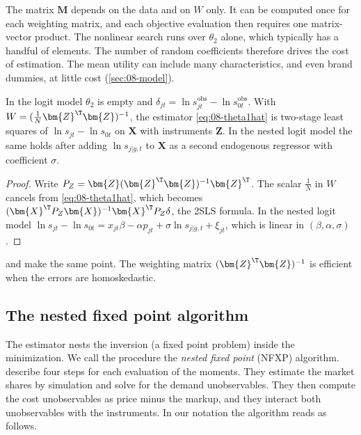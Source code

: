 The matrix $\bm{M}$ depends on the data and on $W$ only. It can be computed once for each weighting matrix,
and each objective evaluation then requires one matrix-vector product. The nonlinear search runs over
$\theta_2$ alone, which typically has a handful of elements. The number of random coefficients therefore drives the
cost of estimation. The mean utility can include many characteristics, and even brand dummies, at little cost
(\cref{sec:08-model}).

\begin{corollary}\label{cor:08-2sls}
In the logit model $\theta_2$ is empty and $\delta_{jt} = \ln s^{\text{obs}}_{jt} - \ln s^{\text{obs}}_{0t}$. With $W =
(\frac{1}{N}\bm{Z}^\T\bm{Z})^{-1}$, the estimator \eqref{eq:08-theta1hat} is two-stage least squares of
$\ln s_{jt} - \ln s_{0t}$ on $\bm{X}$ with instruments $\bm{Z}$. In the nested logit model the same holds
after adding $\ln s_{j|g,t}$ to $\bm{X}$ as a second endogenous regressor with coefficient $\sigma$.
\end{corollary}

\begin{proof}
Write $P_Z = \bm{Z}(\bm{Z}^\T\bm{Z})^{-1}\bm{Z}^\T$. The scalar $\frac{1}{N}$ in $W$ cancels from
\eqref{eq:08-theta1hat}, which becomes $(\bm{X}^\T P_Z\bm{X})^{-1}\bm{X}^\T P_Z\delta$, the 2SLS formula. In
the nested logit model $\ln s_{jt} - \ln s_{0t} = x_{jt}\beta - \alpha p_{jt} + \sigma\ln s_{j|g,t} +
\xi_{jt}$, which is linear in $(\beta, \alpha, \sigma)$.
\end{proof}

 and \citet[p.~319]{Nevo2001} make the same point. The weighting matrix
$(\bm{Z}^\T\bm{Z})^{-1}$ is efficient when the errors are homoskedastic.

\subsection{The nested fixed point algorithm}\label{sec:08-nfxp}

The estimator nests the inversion (a fixed point problem) inside the minimization. We call the procedure the
\emph{nested fixed point} (NFXP) algorithm. \citet[p.~863]{BerryLevinsohnPakes1995} describe four steps for
each evaluation of the moments. They estimate the market shares by simulation and solve for the demand
unobservables. They then compute the cost unobservables as price minus the markup, and they interact both
unobservables with the instruments. In our notation the algorithm reads as follows.

